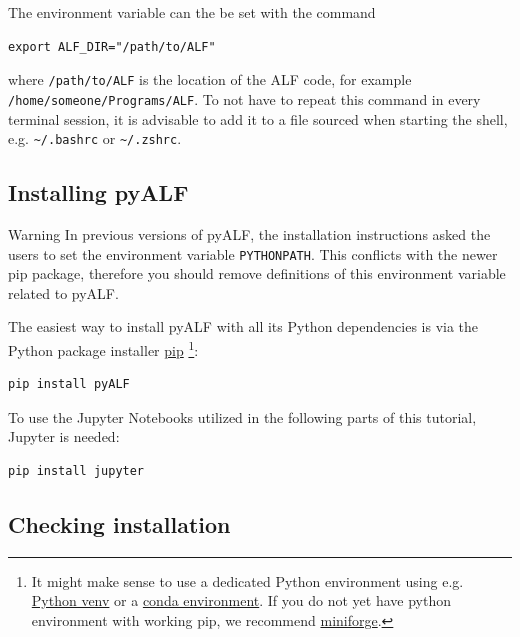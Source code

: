 \documentclass[10pt,modern]{scrartcl}
\numberwithin{exerciseitem}{exercise} %
\begin{document}
The environment variable can the be set with the command

\begin{lstlisting}[style=bash]
export ALF_DIR="/path/to/ALF"
\end{lstlisting}

where \texttt{/path/to/ALF} is the location of the ALF code, for example \texttt{/home/someone/Programs/ALF}. To not have to repeat this command in every terminal session, it is advisable to add it to a file sourced when starting the shell, e.g. \verb|~/.bashrc| or \verb|~/.zshrc|.

\subsection{Installing pyALF}
\begin{mybox}{Warning}
In previous versions of pyALF, the installation instructions asked the users to set the environment variable \texttt{PYTHONPATH}.
This conflicts with the newer pip package, therefore you should remove definitions of this environment variable related to pyALF.
\end{mybox}

The easiest way to install pyALF with all its Python dependencies is via the
Python package installer \href{https://pip.pypa.io}{pip}
\footnote{It might make sense to use a dedicated Python environment using e.g.
\href{https://packaging.python.org/en/latest/guides/installing-using-pip-and-virtual-environments/}{Python venv}
or a
\href{https://conda.io/projects/conda/en/latest/user-guide/tasks/manage-environments.html}{conda environment}.
If you do not yet have python environment with working pip, we recommend 
\href{https://github.com/conda-forge/miniforge}{miniforge}.
}:
\begin{lstlisting}[style=bash]
pip install pyALF
\end{lstlisting}

To use the Jupyter Notebooks utilized in the following parts of this tutorial, Jupyter is needed:
\begin{lstlisting}[style=bash]
pip install jupyter
\end{lstlisting}

\subsection{Checking installation}
\end{document}
